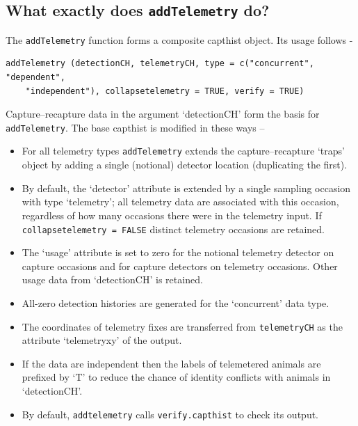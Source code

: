 \documentclass[
]{book}
\providecommand{\tightlist}{%
  \setlength{\itemsep}{0pt}\setlength{\parskip}{0pt}}
\begin{document}
\subsection{\texorpdfstring{What exactly does \texttt{addTelemetry} do?}{What exactly does addTelemetry do?}}\label{what-exactly-does-addtelemetry-do}

The \texttt{addTelemetry} function forms a composite capthist object. Its usage follows -

\begin{verbatim}
addTelemetry (detectionCH, telemetryCH, type = c("concurrent", "dependent", 
    "independent"), collapsetelemetry = TRUE, verify = TRUE) 
\end{verbatim}

Capture--recapture data in the argument `detectionCH' form the basis for \texttt{addTelemetry}. The base capthist is modified in these ways --

\begin{itemize}
\tightlist
\item
  For all telemetry types \texttt{addTelemetry} extends the capture--recapture `traps' object by adding a single (notional) detector location (duplicating the first).
\item
  By default, the `detector' attribute is extended by a single sampling occasion with type `telemetry'; all telemetry data are associated with this occasion, regardless of how many occasions there were in the telemetry input. If \texttt{collapsetelemetry\ =\ FALSE} distinct telemetry occasions are retained.
\item
  The `usage' attribute is set to zero for the notional telemetry detector on capture occasions and for capture detectors on telemetry occasions. Other usage data from `detectionCH' is retained.
\item
  All-zero detection histories are generated for the `concurrent' data type.\\
\item
  The coordinates of telemetry fixes are transferred from \texttt{telemetryCH} as the attribute `telemetryxy' of the output.
\item
  If the data are independent then the labels of telemetered animals are prefixed by `T' to reduce the chance of identity conflicts with animals in `detectionCH'.
\item
  By default, \texttt{addtelemetry} calls \texttt{verify.capthist} to check its output.
\end{itemize}
\end{document}

